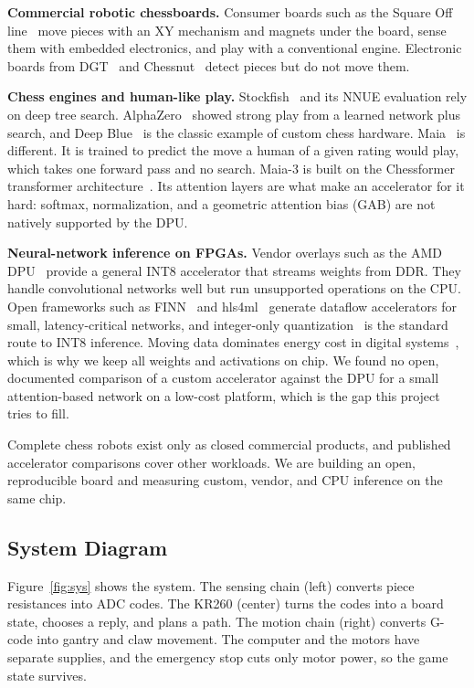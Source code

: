 \documentclass[10pt]{article}
\newcommand{\lead}[1]{\textbf{#1}}
\begin{document}
\lead{Commercial robotic chessboards.} Consumer boards such as the Square Off line~\cite{squareoff}
move pieces with an XY mechanism and magnets under the board, sense them with embedded electronics,
and play with a conventional engine. Electronic boards from DGT~\cite{dgt} and
Chessnut~\cite{chessnut} detect pieces but do not move them.

\lead{Chess engines and human-like play.} Stockfish~\cite{stockfish} and its NNUE evaluation rely
on deep tree search. AlphaZero~\cite{alphazero} showed strong play from a learned network plus
search, and Deep Blue~\cite{deepblue} is the classic example of custom chess hardware.
Maia~\cite{maia} is different. It is trained to predict the move a human of a given rating would
play, which takes one forward pass and no search. Maia-3 is built on the Chessformer transformer
architecture~\cite{chessformer}. Its attention layers are what make an accelerator for it hard:
softmax, normalization, and a geometric attention bias (GAB) are not natively supported by the DPU.

\lead{Neural-network inference on FPGAs.} Vendor overlays such as the AMD DPU~\cite{dpu} provide a
general INT8 accelerator that streams weights from DDR. They handle convolutional networks well but
run unsupported operations on the CPU. Open frameworks such as FINN~\cite{finn} and
hls4ml~\cite{hls4ml} generate dataflow accelerators for small, latency-critical networks, and
integer-only quantization~\cite{jacob} is the standard route to INT8 inference. Moving data
dominates energy cost in digital systems~\cite{horowitz}, which is why we keep all weights and
activations on chip. We found no open, documented comparison of a custom accelerator against the
DPU for a small attention-based network on a low-cost platform, which is the gap this project tries
to fill.

Complete chess robots exist only as closed commercial products, and published accelerator
comparisons cover other workloads. We are building an open, reproducible board and measuring
custom, vendor, and CPU inference on the same chip.

\subsection{System Diagram}

Figure~\ref{fig:sys} shows the system. The sensing chain (left) converts piece resistances into ADC
codes. The KR260 (center) turns the codes into a board state, chooses a reply, and plans a path.
The motion chain (right) converts G-code into gantry and claw movement. The computer and the motors
have separate supplies, and the emergency stop cuts only motor power, so the game state survives.
\end{document}
